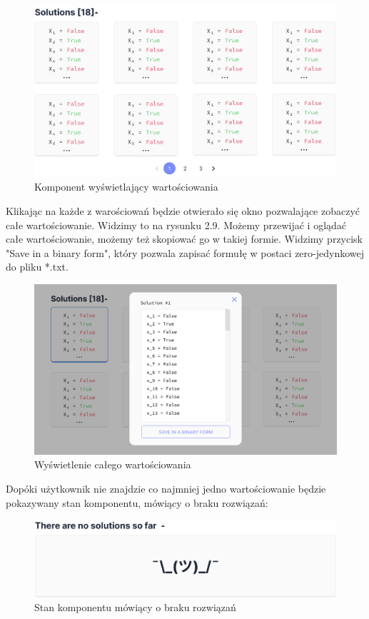 \documentclass[a4paper,12pt,oneside]{book}
\theoremstyle{definition}
\begin{document}
\begin{figure}[ht]
    \centering
    \includegraphics[width=14.30cm]{8}
    \caption{Komponent wyświetlający wartościowania}
    \label{fig:8}
\end{figure}

Klikając na każde z warościowań będzie otwierało się okno pozwalające zobaczyć całe wartościowanie. Widzimy to na rysunku 2.9. Możemy przewijać i oglądać całe wartościowanie, możemy też skopiować go w takiej formie. Widzimy przycisk "Save in a binary form", który pozwala zapisać formułę w postaci zero-jedynkowej do pliku *.txt.

\begin{figure}[ht]
    \centering
    \includegraphics[width=14.30cm]{9}
    \caption{Wyświetlenie całego wartościowania}
    \label{fig:9}
\end{figure}

\newpage

Dopóki użytkownik nie znajdzie co najmniej jedno wartościowanie będzie pokazywany stan komponentu, mówiący o braku rozwiązań: 

\begin{figure}[ht]
    \centering
    \includegraphics[width=14.30cm]{10}
    \caption{Stan komponentu mówiący o braku rozwiązań}
    \label{fig:10}
\end{figure}
\end{document}
